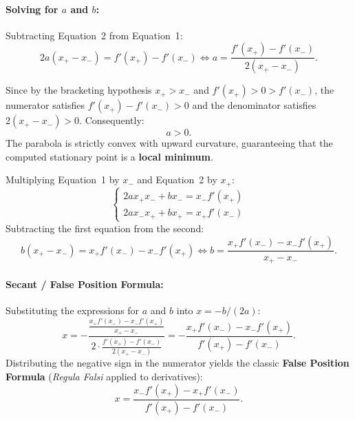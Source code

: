 \paragraph{Solving for $a$ and $b$:}
Subtracting Equation~2 from Equation~1:
\begin{equation}
    2 a (x_+ - x_-) = f'(x_+) - f'(x_-) \iff a = \frac{f'(x_+) - f'(x_-)}{2 (x_+ - x_-)}.
    \label{eq:quadratic-coeff-a-en}
\end{equation}
\begin{property}
Since by the bracketing hypothesis $x_+ > x_-$ and $f'(x_+) > 0 > f'(x_-)$, the numerator satisfies $f'(x_+) - f'(x_-) > 0$ and the denominator satisfies $2(x_+ - x_-) > 0$. Consequently:
\begin{equation}
    a > 0.
\end{equation}
The parabola is strictly convex with upward curvature, guaranteeing that the computed stationary point is a \textbf{local minimum}.
\end{property}

Multiplying Equation~1 by $x_-$ and Equation~2 by $x_+$:
\begin{equation}
    \begin{cases}
        2 a x_+ x_- + b x_- = x_- f'(x_+) \\
        2 a x_- x_+ + b x_+ = x_+ f'(x_-)
    \end{cases}
\end{equation}
Subtracting the first equation from the second:
\begin{equation}
    b (x_+ - x_-) = x_+ f'(x_-) - x_- f'(x_+) \iff b = \frac{x_+ f'(x_-) - x_- f'(x_+)}{x_+ - x_-}.
    \label{eq:quadratic-coeff-b-en}
\end{equation}

\paragraph{Secant / False Position Formula:}
Substituting the expressions for $a$ and $b$ into $x = -b / (2a)$:
\begin{equation}
    x = -\frac{\frac{x_+ f'(x_-) - x_- f'(x_+)}{x_+ - x_-}}{2 \cdot \frac{f'(x_+) - f'(x_-)}{2(x_+ - x_-)}} = -\frac{x_+ f'(x_-) - x_- f'(x_+)}{f'(x_+) - f'(x_-)}.
\end{equation}
Distributing the negative sign in the numerator yields the classic \textbf{False Position Formula} (\textit{Regula Falsi} applied to derivatives):
\begin{equation}
    x = \frac{x_- f'(x_+) - x_+ f'(x_-)}{f'(x_+) - f'(x_-)}.
    \label{eq:false-position-formula-en}
\end{equation}

